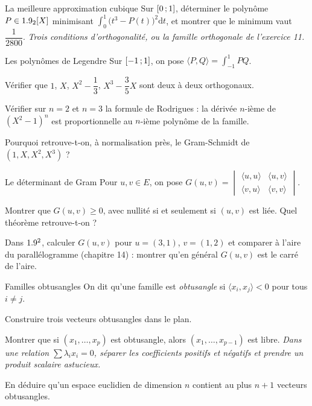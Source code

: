 
\begin{exercice}[3]{La meilleure approximation cubique}
Sur $\mathopen{[}0\,{;}\,1\mathclose{]}$, déterminer le polynôme $P\in1.9_2[X]$ minimisant
$\displaystyle\int_{0}^{1}\bigl(t^{3}-P(t)\bigr)^{2}\mathrm{d}t$, et
montrer que le minimum vaut $\dfrac{1}{2800}$.
\emph{Trois conditions d'orthogonalité, ou la famille orthogonale de
l'exercice 11.}
\end{exercice}

\begin{exercice}[3]{Les polynômes de Legendre}
Sur $\mathopen{[}-1\,{;}\,1\mathclose{]}$, on pose
$\langle P,Q\rangle=\displaystyle\int_{-1}^{1}PQ$.
\begin{questions}
  \item Vérifier que $1$, $X$, $X^{2}-\dfrac13$, $X^{3}-\dfrac35X$ sont
    deux à deux orthogonaux.
  \item Vérifier sur $n=2$ et $n=3$ la formule de Rodrigues : la dérivée
    $n$-ième de $(X^{2}-1)^{n}$ est proportionnelle au $n$-ième polynôme
    de la famille.
  \item Pourquoi retrouve-t-on, à normalisation près, le Gram-Schmidt de
    $(1,X,X^{2},X^{3})$ ?
\end{questions}
\end{exercice}

\begin{exercice}[3]{Le déterminant de Gram}
Pour $u,v\in E$, on pose
$G(u,v)=\begin{vmatrix}\langle u,u\rangle&\langle u,v\rangle\\
\langle v,u\rangle&\langle v,v\rangle\end{vmatrix}$.
\begin{questions}
  \item Montrer que $G(u,v)\geqslant0$, avec nullité si et seulement si
    $(u,v)$ est liée. Quel théorème retrouve-t-on ?
  \item Dans $1.9^{2}$, calculer $G(u,v)$ pour $u=(3,1)$, $v=(1,2)$ et
    comparer à l'aire du parallélogramme (chapitre 14) : montrer qu'en
    général $G(u,v)$ est le carré de l'aire.
\end{questions}
\end{exercice}

\begin{exercice}[3]{Familles obtusangles}
On dit qu'une famille est \emph{obtusangle} si
$\langle x_i,x_j\rangle<0$ pour tous $i\neq j$.
\begin{questions}
  \item Construire trois vecteurs obtusangles dans le plan.
  \item Montrer que si $(x_1,\dots,x_p)$ est obtusangle, alors
    $(x_1,\dots,x_{p-1})$ est libre. \emph{Dans une relation
    $\sum\lambda_ix_i=0$, séparer les coefficients positifs et négatifs
    et prendre un produit scalaire astucieux.}
  \item En déduire qu'un espace euclidien de dimension $n$ contient au
    plus $n+1$ vecteurs obtusangles.
\end{questions}
\end{exercice}


